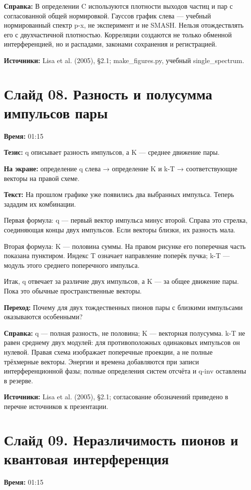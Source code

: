 \documentclass[11pt,a4paper]{article}
\begin{document}
\textbf{Справка:} В определении C используются плотности выходов частиц и пар с согласованной общей нормировкой. Гауссов график слева — учебный нормированный спектр p-x, не эксперимент и не SMASH. Нельзя отождествлять его с двухчастичной плотностью. Корреляции создаются не только обменной интерференцией, но и распадами, законами сохранения и регистрацией.

\textbf{Источники:} Lisa et al. (2005), §2.1; make\_figures.py, учебный single\_spectrum.

\clearpage
\section*{Слайд 08. Разность и полусумма импульсов пары}
\textbf{Время:} 01:15

\textbf{Тезис:} q описывает разность импульсов, а K — среднее движение пары.

\textbf{На экране:} определение q слева → определение K и k-T → соответствующие векторы на правой схеме.

\textbf{Текст:} На прошлом графике уже появились два выбранных импульса. Теперь зададим их комбинации.

Первая формула: q — первый вектор импульса минус второй. Справа это стрелка, соединяющая концы двух импульсов. Если векторы близки, их разность мала.

Вторая формула: K — половина суммы. На правом рисунке его поперечная часть показана пунктиром. Индекс T означает направление поперёк пучка; k-T — модуль этого среднего поперечного импульса.

Итак, q отвечает за различие двух импульсов, а K — за общее движение пары. Пока это обычные пространственные векторы.

\textbf{Переход:} Почему для двух тождественных пионов пары с близкими импульсами оказываются особенными?

\textbf{Справка:} q — полная разность, не половина; K — векторная полусумма. k-T не равен среднему двух модулей: для противоположных одинаковых импульсов он нулевой. Правая схема изображает поперечные проекции, а не полные трёхмерные векторы. Энергии и времена добавляются при записи интерференционной фазы; полные определения систем отсчёта и q-inv оставлены в резерве.

\textbf{Источники:} Lisa et al. (2005), §2.1; согласование обозначений приведено в перечне источников к презентации.

\clearpage
\section*{Слайд 09. Неразличимость пионов и квантовая интерференция}
\textbf{Время:} 01:15
\end{document}
